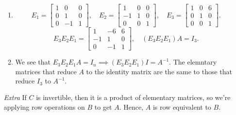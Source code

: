 \begin{enumerate}
		\begin{enumerate}
			\item \[E_1 = \begin{bmatrix}1 & 0 & 0 \\ 0 & 1 & 0 \\ 0 & -1 & 1\end{bmatrix}, \quad E_2 = \begin{bmatrix}1 & 0 & 0 \\ -1 & 1 & 0 \\ 0 & 0 & 1\end{bmatrix}, \quad E_3 = \begin{bmatrix}1 & 0 & 6 \\ 0 & 1 & 0 \\ 0 & 0 & 1\end{bmatrix}.\] \[E_3E_2E_1 = \begin{bmatrix}1 & -6 & 6 \\ -1 & 1 & 0 \\ 0 & -1 & 1\end{bmatrix},\quad (E_3E_2E_1)A = I_3.\]
			\item We see that \(E_3E_2E_1 A = I_n \implies (E_3E_2E_1) I = A^{-1}\). The elemntary matrices that reduce \(A\) to the identity matrix are the 
				same to those that reduce \(I_3\) to \(A^{-1}\).
		\end{enumerate}
	\item[\textit{Extra}] If \(C\) is invertible, then it is a product of elementary matrices, so we're applying row operations on \(B\) to get \(A\). Hence, \(A\) is row
				     equivalent to \(B\).
\end{enumerate}